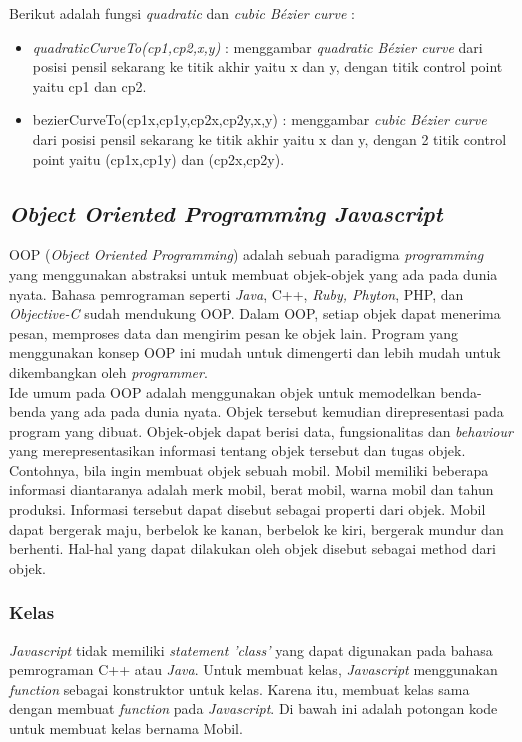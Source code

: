 Berikut adalah fungsi \textit{quadratic} dan \textit{cubic B\'ezier curve} :
\begin{itemize}
	\item \textit{quadraticCurveTo(cp1,cp2,x,y)} : menggambar \textit{quadratic B\'ezier curve} dari posisi pensil sekarang ke titik akhir yaitu x dan y, dengan titik control point yaitu cp1 dan cp2.
	\item bezierCurveTo(cp1x,cp1y,cp2x,cp2y,x,y) : menggambar \textit{cubic B\'ezier curve} dari posisi pensil sekarang ke titik akhir yaitu x dan y, dengan 2 titik control point yaitu (cp1x,cp1y) dan (cp2x,cp2y).
\end{itemize}

\subsection{\textit{Object Oriented Programming Javascript}}
OOP (\textit{Object Oriented Programming}) adalah sebuah paradigma \textit{programming} yang menggunakan abstraksi untuk membuat objek-objek yang ada pada dunia nyata. Bahasa pemrograman seperti \textit{Java}, C++, \textit{Ruby, Phyton}, PHP, dan \textit{Objective-C} sudah mendukung OOP. Dalam OOP, setiap objek dapat menerima pesan, memproses data dan mengirim pesan ke objek lain. Program yang menggunakan konsep OOP ini mudah untuk dimengerti dan lebih mudah untuk dikembangkan oleh \textit{programmer}. \\

Ide umum pada OOP adalah menggunakan objek untuk memodelkan benda-benda yang ada pada dunia nyata. Objek tersebut kemudian direpresentasi pada program yang dibuat. Objek-objek dapat berisi data, fungsionalitas dan \textit{behaviour} yang merepresentasikan informasi tentang objek tersebut dan tugas objek. Contohnya, bila ingin membuat objek sebuah mobil. Mobil memiliki beberapa informasi diantaranya adalah merk mobil, berat mobil, warna mobil dan tahun produksi. Informasi tersebut dapat disebut sebagai properti dari objek. Mobil dapat bergerak maju, berbelok ke kanan, berbelok ke kiri, bergerak mundur dan berhenti. Hal-hal yang dapat dilakukan oleh objek disebut sebagai method dari objek. 

\subsubsection{Kelas}
\textit{Javascript} tidak memiliki \textit{statement 'class'} yang dapat digunakan pada bahasa pemrograman C++ atau \textit{Java}. Untuk membuat kelas, \textit{Javascript} menggunakan \textit{function} sebagai konstruktor untuk kelas. Karena itu, membuat kelas sama dengan membuat \textit{function} pada \textit{Javascript}. Di bawah ini adalah potongan kode untuk membuat kelas bernama Mobil.

